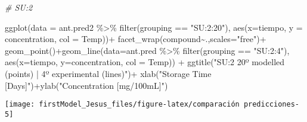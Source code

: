 \documentclass[
]{article}
\newenvironment{Shaded}{\begin{snugshade}}{\end{snugshade}}
\newcommand{\AttributeTok}[1]{\textcolor[rgb]{0.77,0.63,0.00}{#1}}
\newcommand{\CommentTok}[1]{\textcolor[rgb]{0.56,0.35,0.01}{\textit{#1}}}
\newcommand{\FunctionTok}[1]{\textcolor[rgb]{0.00,0.00,0.00}{#1}}
\newcommand{\NormalTok}[1]{#1}
\newcommand{\SpecialCharTok}[1]{\textcolor[rgb]{0.00,0.00,0.00}{#1}}
\newcommand{\StringTok}[1]{\textcolor[rgb]{0.31,0.60,0.02}{#1}}
\begin{document}
\begin{Shaded}
\begin{Highlighting}[]
\CommentTok{\# SU:2}

\FunctionTok{ggplot}\NormalTok{(}\AttributeTok{data =}\NormalTok{ ant.pred2 }\SpecialCharTok{\%\textgreater{}\%} \FunctionTok{filter}\NormalTok{(grouping }\SpecialCharTok{==} \StringTok{"SU:2:20"}\NormalTok{), }\FunctionTok{aes}\NormalTok{(}\AttributeTok{x=}\NormalTok{tiempo, }\AttributeTok{y =}\NormalTok{ concentration, }\AttributeTok{col =}\NormalTok{ Temp))}\SpecialCharTok{+}
  \FunctionTok{facet\_wrap}\NormalTok{(compound}\SpecialCharTok{\textasciitilde{}}\NormalTok{.,}\AttributeTok{scales=}\StringTok{"free"}\NormalTok{)}\SpecialCharTok{+}
  \FunctionTok{geom\_point}\NormalTok{()}\SpecialCharTok{+}\FunctionTok{geom\_line}\NormalTok{(}\AttributeTok{data=}\NormalTok{ant.pred }\SpecialCharTok{\%\textgreater{}\%} \FunctionTok{filter}\NormalTok{(grouping }\SpecialCharTok{==} \StringTok{"SU:2:4"}\NormalTok{), }\FunctionTok{aes}\NormalTok{(}\AttributeTok{x=}\NormalTok{tiempo, }\AttributeTok{y=}\NormalTok{concentration, }\AttributeTok{col =}\NormalTok{ Temp)) }\SpecialCharTok{+}
  \FunctionTok{ggtitle}\NormalTok{(}\StringTok{"SU:2 20º modelled (points) | 4º experimental (lines)"}\NormalTok{)}\SpecialCharTok{+} \FunctionTok{xlab}\NormalTok{(}\StringTok{"Storage Time [Days]"}\NormalTok{)}\SpecialCharTok{+}\FunctionTok{ylab}\NormalTok{(}\StringTok{"Concentration [mg/100mL]"}\NormalTok{)}
\end{Highlighting}
\end{Shaded}

\begin{center}\texttt{[image: firstModel\_Jesus\_files/figure-latex/comparación predicciones-5]} \end{center}
\end{document}
